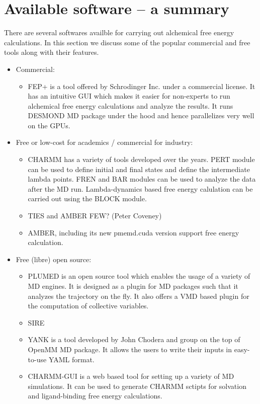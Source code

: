 \documentclass[9pt,bestpractices]{livecoms}
\begin{document}
\section{Available software -- a summary}
\label{sec:software}
There are several softwares availble for carrying out alchemical free energy calculations. In this section we discuss some of the popular commercial and free tools along with their features. 
\begin{itemize}
\item Commercial:
   \begin{itemize}
    \item FEP+ is a tool offered by Schrodinger Inc. under a commercial license. It has an intuitive GUI which makes it easier for non-experts to run alchemical free energy calculations and analyze the results. It runs DESMOND MD package under the hood and hence parallelizes very well on the GPUs. 
    \end{itemize}
\item Free or low-cost for academics / commercial for industry:
	\begin{itemize}
	\item CHARMM has a variety of tools developed over the years. PERT module can be used to define initial and final states and define the intermediate lambda points. FREN and BAR modules can be used to analyze the data after the MD run. Lambda-dynamics based free energy calulation can be carried out using the BLOCK module.  
	\item TIES and AMBER FEW? (Peter Coveney)
	\item AMBER, including its new pmemd.cuda version support free energy calculation. 
	\end{itemize}
\item Free (libre) open source:
	\begin{itemize}
	\item PLUMED is an open source tool which enables the usage of a variety of MD engines. It is designed as a plugin for MD packages such that it analyzes the trajectory on the fly. It also offers a VMD based plugin for the computation of collective variables.   	
	\item SIRE
	\item YANK is a tool developed by John Chodera and group on the top of OpenMM MD package. It allows the users to write their inputs in easy-to-use YAML format. 
	\item CHARMM-GUI is a web based tool for setting up a variety of MD simulations. It can be used to generate CHARMM sctipts for solvation and ligand-binding free energy calculations. 

\end{itemize}
\end{itemize}
\end{document}
